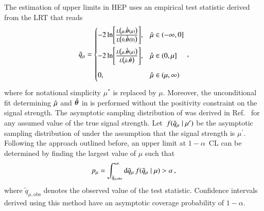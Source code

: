 The estimation of upper limits in HEP uses an empirical test statistic derived
from the LRT that reads~\cite{Cowan:2010js}
\begin{align}
  \tilde{q}_{\mu} =
  \begin{cases}
    -2\ln\mathopen{}\left[ \frac{ L\bigl( \mu, \hat{\hat{\bm{\theta}}}(\mu) \bigr)}{L\bigl( 0, \hat{\hat{\bm{\theta}}}(0) \bigr)} \right]\mathclose{}, & \hat{\mu} \in (-\infty, 0] \\[1em]
    -2\ln\mathopen{}\left[ \frac{ L\bigl( \mu, \hat{\hat{\bm{\theta}}}(\mu) \bigr)}{L\bigl( \hat{\mu}, \hat{\bm{\theta}} \bigr)} \right]\mathclose{}, & \hat{\mu} \in (0, \mu] \\[1em]
    0,\phantom{ \biggl[  \biggr]} & \hat{\mu} \in (\mu, \infty) \\
  \end{cases} \,\text{,}
  \label{eq:qmutilde}
\end{align}
where for notational simplicity $\mu^*$ is replaced by $\mu$. Moreover, the
unconditional fit determining $\hat{\mu}$ and $\hat{\bm{\theta}}$ in
 is performed without the positivity constraint on the signal
strength. The asymptotic sampling distribution of \qmutilde was derived in
Ref.~\cite{Cowan:2010js} for any assumed value of the true signal strength.
Let~$f(\tilde{q}_{\mu} \mid \mu^\prime)$ be the asymptotic sampling distribution of
\qmutilde under the assumption that the signal strength is
$\mu^\prime$. Following the approach outlined before, an upper limit at
$1 - \alpha$~CL can be determined by finding the largest value of $\mu$ such
that
\begin{align*}
  p_\mu = \int_{\tilde{q}_{\mu, \text{obs}}}^{\infty} \mathrm{d}\tilde{q}_{\mu} \, f(\tilde{q}_{\mu} \mid \mu) > \alpha \,\text{,}
\end{align*}
where $\tilde{q}_{\mu, \text{obs}}$ denotes the observed value of the test
statistic. Confidence intervals derived using this method have an asymptotic
coverage probability of $1 - \alpha$.


